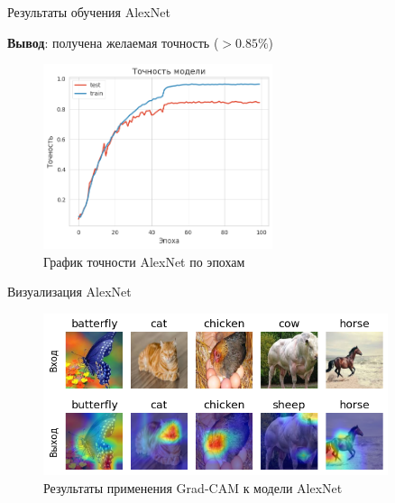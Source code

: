 \documentclass[12pt]{beamer}
\begin{document}
\begin{frame}{Результаты обучения AlexNet}
    \begin{center}
        \textbf{Вывод}: получена желаемая точность ($>0.85\%$)
    \end{center}
    \begin{figure}[ht]
        \centering
        \includegraphics[width=0.6\textwidth]{images/alexnet_lrn_f1.png}
        \caption{График точности AlexNet по эпохам}
        \label{fig:alexnet_f1}
    \end{figure}
\end{frame}

\begin{frame}{Визуализация AlexNet}
    \begin{figure}[ht]
        \centering
        \includegraphics[width=0.9\textwidth]{images/alexnet_out_1.png}
        \caption{Результаты применения Grad-CAM к модели AlexNet}
        \label{fig:alexnet_gradcam_1}
    \end{figure}
\end{frame}
\end{document}
